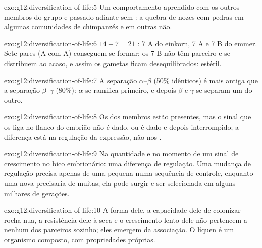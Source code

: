 \begin{solution}{exo:g12:diversification-of-life:5}
Um comportamento aprendido com os outros membros do grupo e passado
adiante sem : a quebra de nozes com pedras em algumas comunidades
de chimpanzés e em outras não.
\end{solution}

\begin{solution}{exo:g12:diversification-of-life:6}
$14 + 7 = 21$ : 7 A do einkorn, 7 A e 7 B do emmer. Sete
pares (A com A) conseguem se formar; os 7  B não têm
parceiro e se distribuem ao acaso, e assim os gametas ficam
desequilibrados: estéril.
\end{solution}

\begin{solution}{exo:g12:diversification-of-life:7}
A separação $\alpha$--$\beta$ (50\% idênticos) é mais antiga que a
separação $\beta$--$\gamma$ (80\%): $\alpha$ se ramifica primeiro, e
depois $\beta$ e $\gamma$ se separam um do outro.
\end{solution}

\begin{solution}{exo:g12:diversification-of-life:8}
Os  dos membros estão presentes, mas o sinal que os liga no flanco
do embrião não é dado, ou é dado e depois interrompido; a diferença
está na regulação da expressão, não nos .
\end{solution}

\begin{solution}{exo:g12:diversification-of-life:9}
Na quantidade e no momento de um sinal de crescimento no bico
embrionário: uma diferença de regulação. Uma mudança de regulação
precisa apenas de uma pequena  numa sequência de controle,
enquanto uma  nova precisaria de muitas; ela pode surgir e ser
selecionada em alguns milhares de gerações.
\end{solution}

\begin{solution}{exo:g12:diversification-of-life:10}
A forma dele, a capacidade dele de colonizar rocha nua, a resistência
dele à seca e o crescimento lento dele não pertencem a nenhum dos
parceiros sozinho; eles emergem da associação. O líquen é um organismo
composto, com propriedades próprias.
\end{solution}

